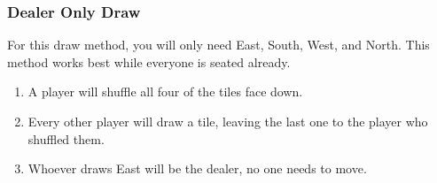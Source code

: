 \subsubsection*{Dealer Only Draw}\label{core:sssec:dealer-only-draw}

For this draw method, you will only need East, South, West, and North. This method works best while everyone is seated already.

\begin{enumerate}
	\item A player will shuffle all four of the tiles face down.
	\item Every other player will draw a tile, leaving the last one to the player who shuffled them.
	\item Whoever draws East will be the dealer, no one needs to move.
\end{enumerate}